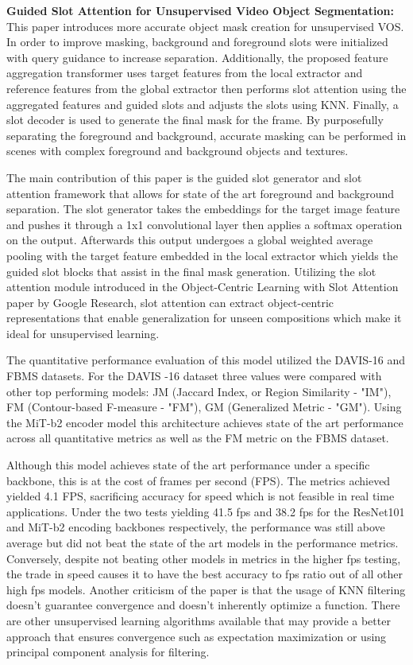 \documentclass{article}
\theoremstyle{plain}
\theoremstyle{definition}
\theoremstyle{remark}
\begin{document}
\textbf{Guided Slot Attention for Unsupervised Video Object Segmentation: }
This paper introduces more accurate object mask creation for unsupervised VOS. In order to improve masking, background and foreground slots were initialized with query guidance to increase separation. Additionally, the proposed feature aggregation transformer uses target features from the local extractor and reference features from the global extractor then performs slot attention using the aggregated features and guided slots and adjusts the slots using KNN. Finally, a slot decoder is used to generate the final mask for the frame. By purposefully separating the foreground and background, accurate masking can be performed in scenes with complex foreground and background objects and textures.

\hspace{20pt} The main contribution of this paper is the guided slot generator and slot attention framework that allows for state of the art foreground and background separation.  The slot generator takes the embeddings for the target image feature and pushes it through a 1x1 convolutional layer then applies a softmax operation on the output. Afterwards this output undergoes a global weighted average pooling with the target feature embedded in the local extractor which yields the guided slot blocks that assist in the final mask generation. Utilizing the slot attention module introduced in the Object-Centric Learning with Slot Attention paper by Google Research, slot attention can extract object-centric representations that enable generalization for unseen compositions which make it ideal for unsupervised learning.

\hspace{20pt} The quantitative performance evaluation of this model utilized the DAVIS-16 and FBMS datasets. For the DAVIS -16 dataset three values were compared with other top performing models: JM (Jaccard Index, or Region Similarity - "IM"), FM (Contour-based F-measure - "FM"), GM (Generalized Metric - "GM"). Using the MiT-b2 encoder model this architecture achieves state of the art performance across all quantitative metrics as well as the FM metric on the FBMS dataset.

\hspace{20pt} Although this model achieves state of the art performance under a specific backbone, this is at the cost of frames per second (FPS). The metrics achieved yielded 4.1 FPS, sacrificing accuracy for speed which is not feasible in real time applications. Under the two tests yielding 41.5 fps and 38.2 fps for the ResNet101 and MiT-b2 encoding backbones respectively, the performance was still above average but did not beat the state of the art models in the performance metrics. Conversely, despite not beating other models in metrics in the higher fps testing, the trade in speed causes it to have the best accuracy to fps ratio out of all other high fps models. Another criticism of the paper is that the usage of KNN filtering doesn’t guarantee convergence and doesn’t inherently optimize a function. There are other unsupervised learning algorithms available that may provide a better approach that ensures convergence such as expectation maximization or using principal component analysis for filtering.
\end{document}
